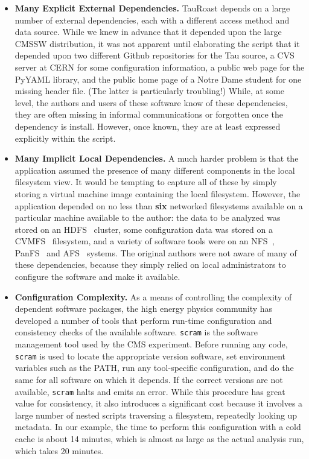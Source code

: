 \documentclass{sig-alternate}
\begin{document}
\begin{itemize}

\item {\bf Many Explicit External Dependencies.}  TauRoast depends on a large number of
external dependencies, each with a different access method and data source.
While we knew in advance that it depended upon the large CMSSW distribution,
it was not apparent until elaborating the script that it depended upon
two different Github repositories for the Tau source,
a CVS server at CERN for some configuration information, a public web page
for the PyYAML library, and the public home page of a Notre Dame student
for one missing header file.  (The latter is particularly troubling!)
While, at some level, the authors and users of these software know of these dependencies, they are often missing in
informal communications or forgotten once the dependency is install.
However, once known, they are at least expressed explicitly within the script.

\item {\bf Many Implicit Local Dependencies.} A much harder problem is that the
application assumed the presence of many different components in the local
filesystem view. It would be tempting to capture all of these by simply
storing a virtual machine image containing the local filesystem. However,
the application depended on no less than {\bf six} networked filesystems
available on a particular machine available to the author:
the data to be analyzed was stored on an HDFS~\cite{hadoop} cluster,
some configuration data was stored on a CVMFS~\cite{cvmfs} filesystem,
and a variety of software tools were on an NFS~\cite{howard1988scale},
PanFS~\cite{welch2008scalable} and AFS~\cite{sandberg1985design} systems.
The original authors were not aware of many of these dependencies,
because they simply relied on local administrators to configure the
software and make it available.

\item {\bf Configuration Complexity.}  As a means of controlling the complexity
of dependent software packages, the high energy physics community has developed
a number of tools that perform run-time configuration and consistency checks
of the available software.  {\tt scram} is the software management tool used
by the CMS experiment.  Before running any code, {\tt scram} is used to locate
the appropriate version software,  set environment variables such as the PATH, run any
tool-specific configuration, and do the same for all software on which it depends.
If the correct versions are not available, {\tt scram} halts and emits an error.
While this procedure has great value for consistency, it also introduces a significant cost
because it involves a large number of nested scripts traversing a filesystem,
repeatedly looking up metadata.  In our example, the time to perform this configuration
with a cold cache is about 14 minutes, which is almost as large as the actual analysis
run, which takes 20 minutes.


\end{itemize}
\end{document}

